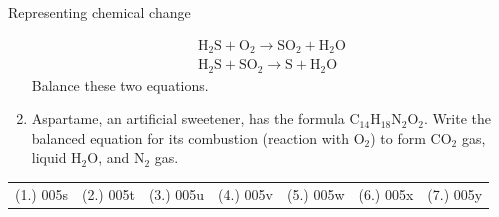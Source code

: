 \begin{eocexercises}{Representing chemical change}
\begin{enumerate}[noitemsep, label=\textbf{\arabic*}. ]
\begin{eqnarray*}
{\text{H}}_{2}\text{S} + {\text{O}}_{2} \to {\text{SO}}_{2} + {\text{H}}_{2}\text{O} \\ 
{\text{H}}_{2}\text{S} + {\text{SO}}_{2} \to \text{S} + {\text{H}}_{2}\text{O} 
      \end{eqnarray*}
Balance these two equations.
\label{m38727*uid46}\item Aspartame, an artificial sweetener, has the formula ${\text{C}}_{14}{\text{H}}_{18}{\text{N}}_{2}{\text{O}}_{2}$. Write the balanced equation for its combustion (reaction with ${\text{O}}_{2}$) to form ${\text{CO}}_{2}$ gas, liquid $\text{H}_{2}\text{O}$, and ${\text{N}}_{2}$ gas.
\end{enumerate}
\practiceinfo
\par 
 \par \begin{tabular}[h]{cccccc}
 (1.) 005s  &  (2.) 005t  &  (3.) 005u  &  (4.) 005v  &  (5.) 005w  &  (6.) 005x  &  (7.) 005y  & \end{tabular}
\end{eocexercises}

